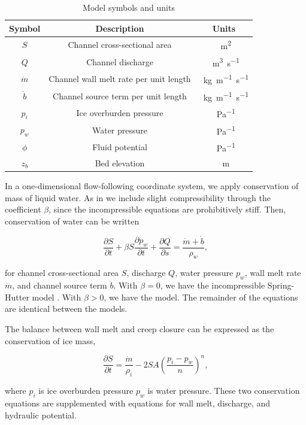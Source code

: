\documentclass[11pt]{article}
\begin{document}
\begin{table}[t]
\centering
\caption{Model symbols and units}
\begin{tabular}{c c c}
\hline
Symbol & Description & Units \\
\hline 
$S$ & Channel cross-sectional area  & \SI{}{m^2} \\
$Q$ & Channel discharge & \SI{}{m^3.s^{-1}} \\
$\dot m$ & Channel wall melt rate per unit length & \SI{}{kg.m^{-1}.s^{-1}} \\
$\dot b$ & Channel source term per unit length & \SI{}{kg.m^{-1}.s^{-1}} \\
$p_i$ & Ice overburden pressure & \SI{}{Pa^{-1}} \\
$p_w$ & Water pressure & \SI{}{Pa^{-1}} \\
$\phi$ & Fluid potential & \SI{}{Pa^{-1}} \\
$z_b$ & Bed elevation & \SI{}{m} \\
\hline
\end{tabular}
\end{table}

In a one-dimensional flow-following coordinate system, we apply conservation of mass of liquid water. As in \citet{clarke2003} we include slight compressibility through the coefficient $\beta$, since the incompressible equations are prohibitively stiff. Then, conservation of water can be written
\begin{linenomath*}
\begin{equation}
\label{eq:consWater}
\frac{\partial S}{\partial t} + \beta S \frac{\partial p_w}{\partial t} + \frac{\partial Q}{\partial s} = \frac{\dot m + \dot b}{\rho_w},
\end{equation}
\end{linenomath*}
for channel cross-sectional area $S$, discharge $Q$, water pressure $p_w$, wall melt rate $\dot m$, and channel source term $\dot b$. With $\beta = 0$, we have the incompressible Spring-Hutter model \citep{spring1981, spring1982}. With $\beta > 0$, we have the \citet{clarke2003} model. The remainder of the equations are identical between the models.


The balance between wall melt and creep closure can be expressed as the conservation of ice mass,
\begin{linenomath*}
\begin{equation}
\label{eq:consIce}
\frac{\partial S}{\partial t} = \frac{\dot m}{\rho_i} - 2SA\left(\frac{p_i - p_w}{n} \right)^n,
\end{equation}
\end{linenomath*}
where $p_i$ is ice overburden pressure $p_w$ is water pressure. These two conservation equations are supplemented with equations for wall melt, discharge, and hydraulic potential. 
\end{document}
